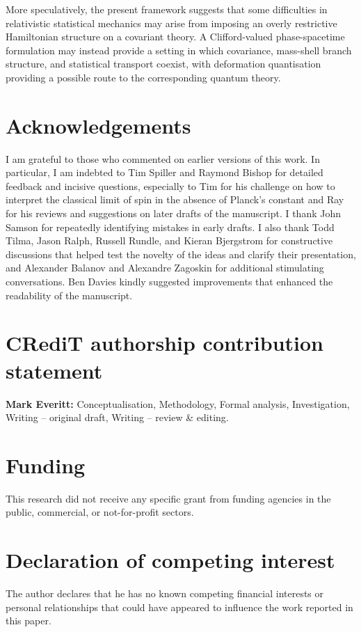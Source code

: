 \documentclass[final,5p,times,twocolumn]{elsarticle}
\begin{document}
More speculatively, the present framework suggests that some difficulties in relativistic statistical mechanics may arise from imposing an overly restrictive Hamiltonian structure on a covariant theory. 
A Clifford-valued phase-spacetime formulation may instead provide a setting in which covariance, mass-shell branch structure, and statistical transport coexist, with deformation quantisation
providing a possible route to the corresponding quantum theory.

\section*{Acknowledgements}
I am grateful to those who commented on earlier versions of this work. 
In particular, I am indebted to Tim Spiller and Raymond Bishop for detailed feedback and incisive questions, especially to Tim for his challenge on how to interpret the classical limit of spin in the absence of Planck's constant and Ray for his reviews and suggestions on later drafts of the manuscript. 
I thank John Samson for repeatedly identifying mistakes in early drafts.
I also thank Todd Tilma, Jason Ralph, Russell Rundle, and Kieran Bjergstrom for constructive discussions that helped test the novelty of the ideas and clarify their presentation, and Alexander Balanov and Alexandre Zagoskin for additional stimulating conversations. 
Ben Davies kindly suggested improvements that enhanced the readability of the manuscript.

\section*{CRediT authorship contribution statement}
\textbf{Mark Everitt:} Conceptualisation, Methodology, Formal analysis,
Investigation, Writing -- original draft, Writing -- review \& editing.

\section*{Funding}
This research did not receive any specific grant from funding agencies in the
public, commercial, or not-for-profit sectors.

\section*{Declaration of competing interest}
The author declares that he has no known competing financial interests or
personal relationships that could have appeared to influence the work reported
in this paper.
\end{document}
